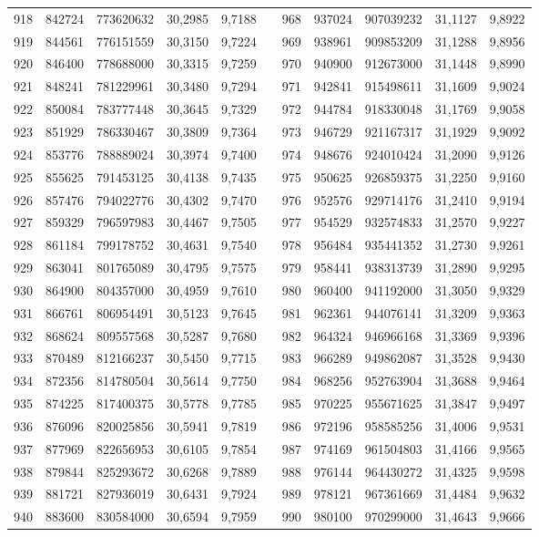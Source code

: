 \begin{longtable}{rrrrrrrrrrr}
918&842724&773620632&30,2985&9,7188&&968&937024&907039232&31,1127&9,8922\\
919&844561&776151559&30,3150&9,7224&&969&938961&909853209&31,1288&9,8956\\
920&846400&778688000&30,3315&9,7259&&970&940900&912673000&31,1448&9,8990\\
921&848241&781229961&30,3480&9,7294&&971&942841&915498611&31,1609&9,9024\\
922&850084&783777448&30,3645&9,7329&&972&944784&918330048&31,1769&9,9058\\
923&851929&786330467&30,3809&9,7364&&973&946729&921167317&31,1929&9,9092\\
924&853776&788889024&30,3974&9,7400&&974&948676&924010424&31,2090&9,9126\\
925&855625&791453125&30,4138&9,7435&&975&950625&926859375&31,2250&9,9160\\
926&857476&794022776&30,4302&9,7470&&976&952576&929714176&31,2410&9,9194\\
927&859329&796597983&30,4467&9,7505&&977&954529&932574833&31,2570&9,9227\\
928&861184&799178752&30,4631&9,7540&&978&956484&935441352&31,2730&9,9261\\
929&863041&801765089&30,4795&9,7575&&979&958441&938313739&31,2890&9,9295\\
930&864900&804357000&30,4959&9,7610&&980&960400&941192000&31,3050&9,9329\\
931&866761&806954491&30,5123&9,7645&&981&962361&944076141&31,3209&9,9363\\
932&868624&809557568&30,5287&9,7680&&982&964324&946966168&31,3369&9,9396\\
933&870489&812166237&30,5450&9,7715&&983&966289&949862087&31,3528&9,9430\\
934&872356&814780504&30,5614&9,7750&&984&968256&952763904&31,3688&9,9464\\
935&874225&817400375&30,5778&9,7785&&985&970225&955671625&31,3847&9,9497\\
936&876096&820025856&30,5941&9,7819&&986&972196&958585256&31,4006&9,9531\\
937&877969&822656953&30,6105&9,7854&&987&974169&961504803&31,4166&9,9565\\
938&879844&825293672&30,6268&9,7889&&988&976144&964430272&31,4325&9,9598\\
939&881721&827936019&30,6431&9,7924&&989&978121&967361669&31,4484&9,9632\\
940&883600&830584000&30,6594&9,7959&&990&980100&970299000&31,4643&9,9666\\

\end{longtable}
